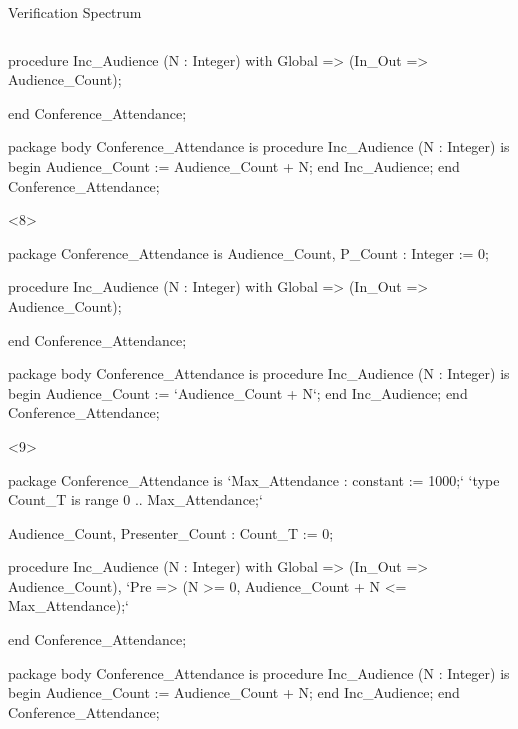 \documentclass{beamer}
\begin{document}
\begin{frame}[fragile]{Verification Spectrum}
\begin{columns}
\begin{column}{9cm}
\begin{onlyenv}
\begin{pxcode}[language=SPARK,style=magic,gobble=8]
           procedure Inc_Audience (N : Integer)
           with Global => (In_Out => Audience_Count);

        end Conference_Attendance;

        package body Conference_Attendance
        is
           procedure Inc_Audience (N : Integer)
           is
           begin
              Audience_Count := Audience_Count + N;
           end Inc_Audience;
        end Conference_Attendance;
      \end{pxcode}
      \end{onlyenv}

      \begin{onlyenv}<8>
      \begin{pxcode}[language=SPARK,style=magic,gobble=8]
        package Conference_Attendance
        is
           Audience_Count, P_Count : Integer := 0;

           procedure Inc_Audience (N : Integer)
           with Global => (In_Out => Audience_Count);

        end Conference_Attendance;

        package body Conference_Attendance
        is
           procedure Inc_Audience (N : Integer)
           is
           begin
              Audience_Count := `Audience_Count + N`;
           end Inc_Audience;
        end Conference_Attendance;
      \end{pxcode}
      \end{onlyenv}

      \begin{onlyenv}<9>
      \begin{pxcode}[language=SPARK,style=magic,gobble=8]
        package Conference_Attendance
        is
           `Max_Attendance : constant := 1000;`
           `type Count_T is range 0 .. Max_Attendance;`

           Audience_Count, Presenter_Count : Count_T := 0;

           procedure Inc_Audience (N : Integer)
           with Global => (In_Out => Audience_Count),
                `Pre    => (N >= 0, Audience_Count + N <= Max_Attendance);`

        end Conference_Attendance;

        package body Conference_Attendance
        is
           procedure Inc_Audience (N : Integer)
           is
           begin
              Audience_Count := Audience_Count + N;
           end Inc_Audience;
        end Conference_Attendance;
      \end{pxcode}
      \end{onlyenv}


\end{column}
\end{columns}
\end{frame}
\end{document}
